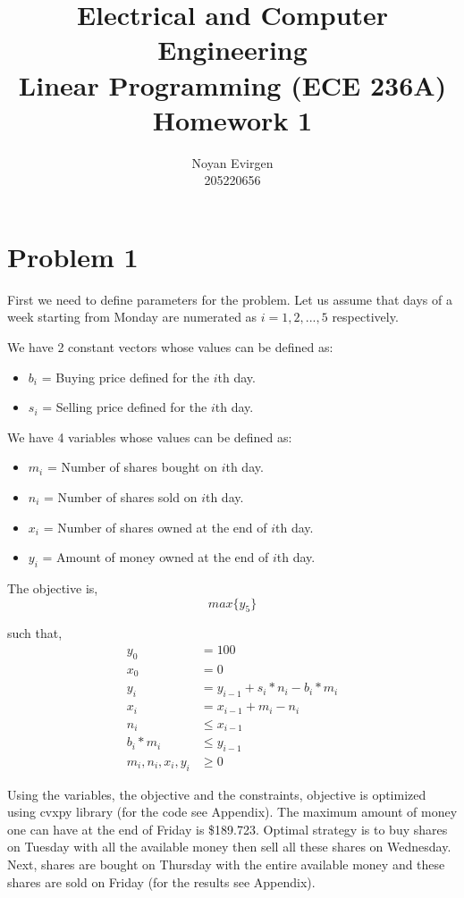\documentclass[]{report}
\title{Electrical and Computer Engineering \\
	Linear Programming (ECE 236A)\\
	Homework 1
	}
\author{Noyan Evirgen \\	
		205220656}
\begin{document}
\maketitle

\chapter{Problem 1}

First we need to define parameters for the problem. Let us assume that days of a week starting from Monday are numerated as $i = 1,2,...,5$ respectively. 
 
We have 2 constant vectors whose values can be defined as:
\begin{itemize}
	\item $b_i$ = Buying price defined for the $i$th day.
	\item $s_i$ = Selling price defined for the $i$th day.
\end{itemize}

We have 4 variables whose values can be defined as:
\begin{itemize}
	\item $m_i$ = Number of shares bought on $i$th day.
	\item $n_i$ = Number of shares sold on $i$th day.
	\item $x_i$ = Number of shares owned at the end of $i$th day.
	\item $y_i$ = Amount of money owned at the end of $i$th day. 
\end{itemize}

The objective is,
\begin{equation}
	max \{y_5\}
\end{equation}

such that,
\begin{equation}
\begin{split}
y_0 &= 100 \\
x_0 &= 0 \\
y_i &= y_{i-1} + s_i*n_i - b_i*m_i \\
x_i &= x_{i-1} + m_i - n_i \\
n_i & \leq x_{i-1} \\
b_i*m_i &\leq y_{i-1} \\
m_i, n_i, x_i, y_i &\geq 0
\end{split}
\end{equation}

Using the variables, the objective and the constraints, objective is optimized using cvxpy library (for the code see Appendix). The maximum amount of money one can have at the end of Friday is \$189.723. Optimal strategy is to buy shares on Tuesday with all the available money then sell all these shares on Wednesday. Next, shares are bought on Thursday with the entire available money and these shares are sold on Friday (for the results see Appendix).
 
\end{document}
